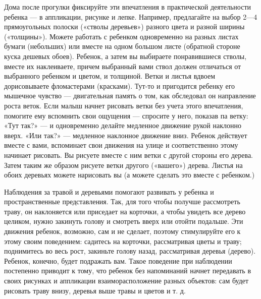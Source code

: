 \documentclass{book}
\begin{document}
Дома после прогулки фиксируйте эти впечатления в практической
деятельности ребенка --- в аппликации, рисунке и лепке. Например,
предлагайте на выбор 2---4 прямоугольных полоски («стволы деревьев»)
разного цвета и разной ширины («толщины»). Можете работать с ребенком
одновременно на разных листах бумаги (небольших) или вместе на одном
большом листе (обратной стороне куска дешевых обоев). Ребенок, а затем
вы выбираете понравившиеся стволы, вместе их наклеиваете, причем
выбранный вами ствол должен отличаться от выбранного ребенком и цветом,
и толщиной. Ветки и листья вдвоем дорисовываете фломастерами (красками).
Тут-то и пригодится ребенку его мышечное чувство --- двигательная память
о том, как обследовал он направление роста веток. Если малыш начнет
рисовать ветки без учета этого впечатления, помогите ему вспомнить свои
ощущения --- спросите у него, показав па ветку: «Тут так?» --- и
одновременно делайте медленное движение рукой наклонно вверх. «Или так?»
--- медленное наклонное движение вниз. Ребенок действует вместе с вами,
вспоминает свои движения на улице и соответственно этому начинает
рисовать. Вы рисуете вместе с ним ветки с другой стороны его дерева.
Затем таким же образом рисуете ветки другого («вашего») дерева. Листья
на обоих деревьях можете нарисовать вы (а можете сделать это вместе с
ребенком.)

Наблюдения за травой и деревьями помогают развивать у ребенка и
пространственные представления. Так, для того чтобы получше рассмотреть
траву, он наклоняется или приседает на корточки, а чтобы увидеть все
дерево целиком, нужно закинуть голову и смотреть вверх или отойти
подальше. Эти движения ребенок, возможно, сам и не сделает, поэтому
стимулируйте его к этому своим поведением: садитесь на корточки,
рассматривая цветы и траву; поднимитесь во весь рост, закиньте голову
назад, рассматривая деревья (дерево). Ребенок, конечно, будет подражать
вам. Такое поведение при наблюдении постепенно приводит к тому, что
ребенок без напоминаний начнет передавать в своих рисунках и аппликации
взаиморасположение разных объектов: сам будет рисовать траву внизу,
деревья выше травы и цветов и т. д.
\end{document}
